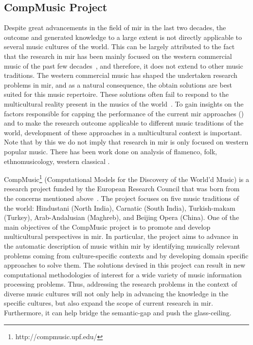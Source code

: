 \subsection{CompMusic Project}
\label{sec:intro_motivation_compmusic}

Despite great advancements in the field of \gls{mir} in the last two decades, the outcome and generated knowledge to a large extent is not directly applicable to several music cultures of the world. This can be largely attributed to the fact that the research in \gls{mir} has been mainly focused on the western commercial music of the past few decades~\citep{XavierSerra2011}, and therefore, it does not extend to other music traditions. The western commercial music has shaped the undertaken research problems in \gls{mir}, and as a natural consequence, the obtain solutions are best suited for this music repertoire. These solutions often fail to respond to the multicultural reality present in the musics of the world~\citep{XavierSerra2011}. To gain insights on the factors responsible for capping the performance of the current \gls{mir} approaches () and to make the research outcome applicable to different music traditions of the world, development of these approaches in a multicultural context is important. Note that by this we do not imply that research  in \gls{mir} is only focused on western popular music. There has been work done on analysis of flamenco, folk, ethnomusicology, western classical .

CompMusic\footnote{http://compmusic.upf.edu/} (Computational Models for the Discovery of the World'd Music) is a research project funded by the European Research Council that was born from the concerns mentioned above~\citep{XavierSerra2011}. The project focuses on five music traditions of the world: Hindustani (North India), Carnatic (South India), Turkish-makam (Turkey), Arab-Andalusian (Maghreb), and Beijing Opera (China). One of the main objectives of the CompMusic project is to promote and develop multicultural perspectives in \gls{mir}. In particular, the project aims to advance in the automatic description of music within \gls{mir} by identifying musically relevant problems coming from culture-specific contexts and by developing domain specific approaches to solve them. The solutions devised in this project can result in new computational methodologies of interest for a wide variety of music information processing problems. Thus, addressing the research problems in the context of diverse music cultures will not only help in advancing the knowledge in the specific cultures, but also expand the scope of current research in \gls{mir}. Furthermore, it can help bridge the semantic-gap and push the glass-ceiling. 

